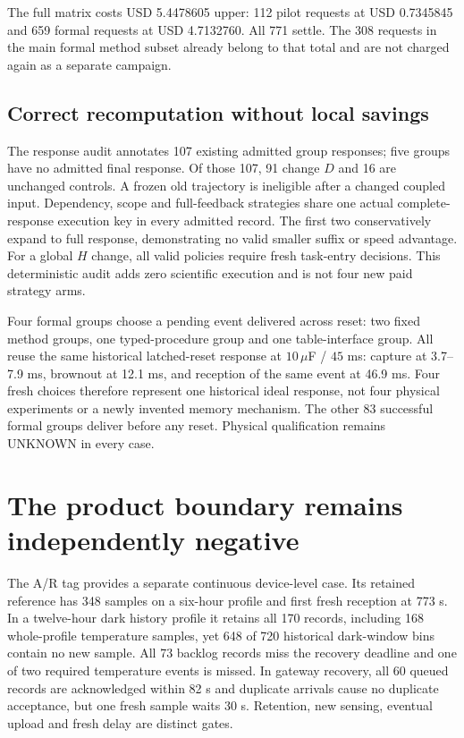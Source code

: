The full matrix costs USD 5.4478605 upper: 112 pilot requests at USD 0.7345845
and 659 formal requests at USD 4.7132760. All 771 settle. The 308 requests in
the main formal method subset already belong to that total and are not charged
again as a separate campaign.

\subsection{Correct recomputation without local savings}
The response audit annotates 107 existing admitted group responses; five groups
have no admitted final response. Of those 107, 91 change $D$ and 16 are unchanged
controls. A frozen old trajectory is ineligible after a changed coupled input.
Dependency, scope and full-feedback strategies share one actual complete-response
execution key in every admitted record. The first two conservatively expand to
full response, demonstrating no valid smaller suffix or speed advantage. For
a global $H$ change, all valid policies require fresh task-entry decisions.
This deterministic audit adds zero scientific execution and is not four new
paid strategy arms.

Four formal groups choose a pending event delivered across reset: two fixed
method groups, one typed-procedure group and one table-interface group. All
reuse the same historical latched-reset response at $10\,\mu$F / $45$ ms:
capture at 3.7--7.9 ms, brownout at 12.1 ms, and reception of the same event at
46.9 ms. Four fresh choices therefore represent one historical ideal response,
not four physical experiments or a newly invented memory mechanism. The other
83 successful formal groups deliver before any reset. Physical qualification
remains UNKNOWN in every case.



\section{The product boundary remains independently negative}
\label{sec:ar}
The A/R tag provides a separate continuous device-level case. Its retained
reference has 348 samples on a six-hour profile and first fresh reception at
773 s. In a twelve-hour dark history profile it retains all 170 records,
including 168 whole-profile temperature samples, yet 648 of 720 historical
dark-window bins contain no new sample. All 73 backlog records miss the
recovery deadline and one of two required temperature events is missed.
In gateway recovery, all 60 queued records are acknowledged within 82 s and
duplicate arrivals cause no duplicate acceptance, but one fresh sample waits
30 s. Retention, new sensing, eventual upload and fresh delay are distinct gates.

